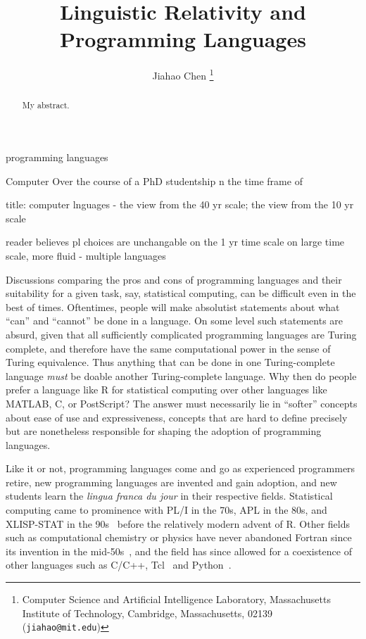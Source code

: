 \documentclass[11pt]{asaproc}
\title{Linguistic Relativity and Programming Languages}
\author{
    Jiahao Chen
    \thanks{Computer Science and Artificial Intelligence Laboratory,
               Massachusetts Institute of Technology,
               Cambridge, Massachusetts, 02139 ({\tt jiahao@mit.edu})}
}
\begin{document}
\maketitle

\begin{abstract}
My abstract.
\end{abstract}

\begin{keywords}
    programming languages
\end{keywords}

\listoftodos

Computer
Over the course of a PhD studentship n the time frame of

title: computer lnguages - the view from the 40 yr scale; the view from the 10 yr scale

reader believes pl choices are unchangable on the 1 yr time scale
on large time scale, more fluid - multiple languages

Discussions comparing the pros and cons of programming languages and their suitability for a given task, say, statistical computing, can be difficult even in the best of times.
Oftentimes, people will make absolutist statements about what ``can'' and ``cannot''
be done in a language. On some level such statements are absurd, given that all
sufficiently complicated programming languages are Turing complete, and therefore
have the same computational power in the sense of Turing equivalence. Thus anything
that can be done in one Turing-complete language \textit{must} be doable another
Turing-complete language. Why then do people prefer a language like R for
statistical computing over other languages like MATLAB, C, or PostScript?
The answer must necessarily lie in ``softer'' concepts about ease of use and
expressiveness, concepts that are hard to define precisely but are nonetheless
responsible for shaping the adoption of programming languages.


Like it or not, programming languages come and go as experienced programmers
retire, new programming languages are invented and gain adoption,
and new students learn the \textit{lingua franca du jour} in their respective
fields. Statistical computing came to prominence with PL/I in the 70s, APL in
the 80s, and XLISP-STAT in the 90s~\cite{deLeeuw2005} before the relatively
modern advent of R. Other fields such as computational chemistry or physics have
never abandoned Fortran since its invention in the mid-50s~\cite{Fortran1},
and the field has since allowed for a coexistence of other languages such as C/C++,
Tcl~\cite{Phillips2014} and Python~\cite{scipy}.
\end{document}
